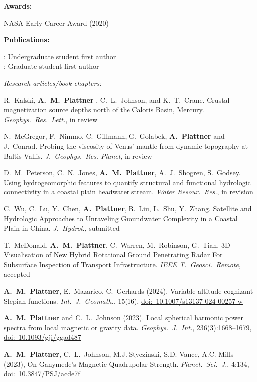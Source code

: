 \documentclass[10pt]{article}
\begin{document}
\spc
\textbf{\tsize Awards:}

\spcp
NASA Early Career Award (2020)


\spc
\textbf{\tsize Publications:}

\spcp
\ug: Undergraduate student first author\\
\gr: Graduate student first author


\spcp
\emph{Research articles/book chapters:}

\spcp 
\hspace*{-0.26cm} \gr R.\ Kalski, \textbf{A.\ M.\ Plattner} , C.\ L.\ Johnson, and K.\ T.\ Crane. Crustal magnetization source depths north of the Caloris Basin, Mercury. \emph{Geophys.~Res.~Lett.}, in review

\spcp N.\ McGregor, F.\ Nimmo, C.\ Gillmann, G.\ Golabek, \textbf{A.\ Plattner} and J.\ Conrad. Probing the viscosity of Venus' mantle from dynamic topography at Baltis Vallis. \emph{J.~Geophys.~Res.-Planet}, in review

\spcp
D.\ M.\ Peterson, C.\ N.\ Jones, \textbf{A.\ M.\ Plattner}, A.\ J.\ Shogren, S.\ Godsey. Using hydrogeomorphic features to quantify structural and functional hydrologic connectivity in a coastal plain headwater stream. \emph{Water Resour.\ Res.}, in revision

\spcp C.\ Wu, C.\ Lu, Y.\ Chen, \textbf{A.\ Plattner}, B.\ Liu, L.\ Shu, Y.\ Zhang. Satellite and Hydrologic Approaches to Unraveling Groundwater Complexity in a Coastal Plain in China. \emph{J.\ Hydrol.}, submitted

\spcp
\shift[19]
T.\ McDonald, \textbf{A.\ M.\ Plattner}, C.\ Warren, M.\ Robinson, G.\ Tian. 3D Visualisation of New Hybrid Rotational Ground Penetrating Radar For Subsurface Inspection of Transport Infrastructure. \emph{IEEE T.\ Geosci.\ Remote}, accepted

\spcp
\shift[18] \textbf{A.~M.~Plattner}, E.\ Mazarico, C.\ Gerhards (2024). Variable altitude cognizant Slepian functions. \emph{Int.~J.~Geomath.}, 15(16), \href{https://doi.org/10.1007/s13137-024-00257-w}{doi:~10.1007/s13137-024-00257-w}

\spcp
\shift[17] \textbf{A.~M.~Plattner} and C.\ L.~Johnson (2023). Local spherical harmonic power spectra from local magnetic or gravity data. \emph{Geophys.~J.~Int.}, 236(3):1668--1679,  \href{https://doi.org/10.1093/gji/ggad487}{doi:~10.1093/gji/ggad487} 

\spcp
\shift[16] \textbf{A.~M.~Plattner}, C.\ L.~Johnson, M.J. Styczinski, S.D. Vance, A.C. Mills (2023), On Ganymede's Magnetic Quadrupolar Strength. \emph{Planet.\ Sci.\ J.}, 4:134, \href{https://doi.org/10.3847/PSJ/acde7f}{doi:~10.3847/PSJ/acde7f} 
\end{document}
